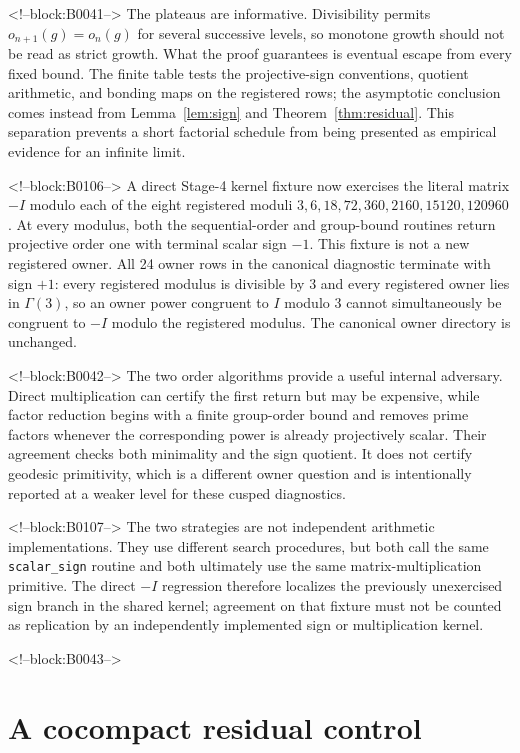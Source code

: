 \documentclass[11pt]{article}
\theoremstyle{definition}
\theoremstyle{remark}
\begin{document}
<!--block:B0041-->
The plateaus are informative. Divisibility permits $o_{n+1}(g)=o_n(g)$ for several successive levels, so monotone growth should not be read as strict growth. What the proof guarantees is eventual escape from every fixed bound. The finite table tests the projective-sign conventions, quotient arithmetic, and bonding maps on the registered rows; the asymptotic conclusion comes instead from Lemma~\ref{lem:sign} and Theorem~\ref{thm:residual}. This separation prevents a short factorial schedule from being presented as empirical evidence for an infinite limit.

<!--block:B0106-->
A direct Stage-4 kernel fixture now exercises the literal matrix $-I$ modulo each of the eight registered moduli $3,6,18,72,360,2160,15120,120960$. At every modulus, both the sequential-order and group-bound routines return projective order one with terminal scalar sign $-1$. This fixture is not a new registered owner. All 24 owner rows in the canonical diagnostic terminate with sign $+1$: every registered modulus is divisible by $3$ and every registered owner lies in $\Gamma(3)$, so an owner power congruent to $I$ modulo $3$ cannot simultaneously be congruent to $-I$ modulo the registered modulus. The canonical owner directory is unchanged.

<!--block:B0042-->
The two order algorithms provide a useful internal adversary. Direct multiplication can certify the first return but may be expensive, while factor reduction begins with a finite group-order bound and removes prime factors whenever the corresponding power is already projectively scalar. Their agreement checks both minimality and the sign quotient. It does not certify geodesic primitivity, which is a different owner question and is intentionally reported at a weaker level for these cusped diagnostics.

<!--block:B0107-->
The two strategies are not independent arithmetic implementations. They use different search procedures, but both call the same \texttt{scalar\_sign} routine and both ultimately use the same matrix-multiplication primitive. The direct $-I$ regression therefore localizes the previously unexercised sign branch in the shared kernel; agreement on that fixture must not be counted as replication by an independently implemented sign or multiplication kernel.

<!--block:B0043-->
\section{A cocompact residual control}
\end{document}
